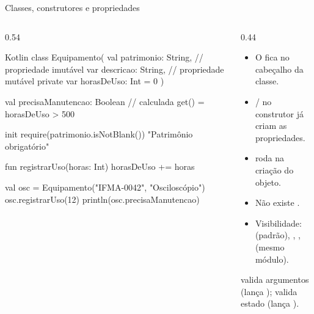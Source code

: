 \documentclass[aspectratio=169,10pt]{beamer}
\begin{document}
\begin{frame}[fragile]{Classes, construtores e propriedades}
  \begin{columns}[T]
    \begin{column}{0.54\textwidth}
\begin{codigo}[title=Classes]{Kotlin}
class Equipamento(
  val patrimonio: String,       // propriedade imutável
  var descricao: String,        // propriedade mutável
  private var horasDeUso: Int = 0
) {
  val precisaManutencao: Boolean   // calculada
    get() = horasDeUso > 500

  init {
    require(patrimonio.isNotBlank()) { "Patrimônio obrigatório" }
  }

  fun registrarUso(horas: Int) { horasDeUso += horas }
}

val osc = Equipamento("IFMA-0042", "Osciloscópio")
osc.registrarUso(12)
println(osc.precisaManutencao)
\end{codigo}
    \end{column}
    \begin{column}{0.44\textwidth}
      \small
      \begin{itemize}
        \item O  fica no cabeçalho da classe.
        \item {}/ no construtor já criam as propriedades.
        \item {} roda na criação do objeto.
        \item Não existe .
        \item Visibilidade:  (padrão), , ,  (mesmo módulo).
      \end{itemize}
      \begin{dica}
         valida argumentos (lança );  valida estado (lança ).
      \end{dica}
    \end{column}
  \end{columns}
\end{frame}
\end{document}
